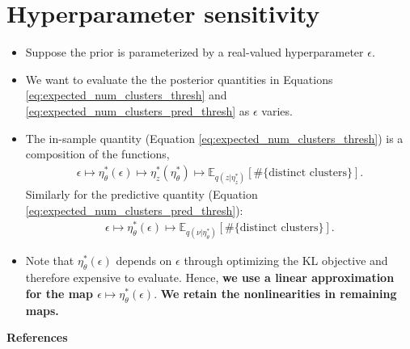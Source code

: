 \documentclass[a0,plainsections]{sciposter}\usepackage[]{graphicx}\usepackage[]{color}
\newcommand{\Expect}{\mathbb{E}}
\newcommand{\etazopt}{\eta_z^{*}}
\newcommand{\etathetaopt}{\eta_\theta^{*}}
\begin{document}
\begin{minipage}[t]{0.45\textwidth}
\vspace{-0.6in}
\section*{Hyperparameter sensitivity}
\vspace{-0.3in}
\begin{itemize}
\item Suppose the prior is parameterized by a real-valued hyperparameter $\epsilon$. 

\item We want to evaluate the the posterior quantities in Equations \ref{eq:expected_num_clusters_thresh} and \ref{eq:expected_num_clusters_pred_thresh} as $\epsilon$ varies. 

\item The in-sample quantity (Equation \ref{eq:expected_num_clusters_thresh}) is a composition of the functions, 
\begin{align*}
\epsilon \mapsto
\etathetaopt(\epsilon) \mapsto
\etazopt\left(\etathetaopt\right) \mapsto
\Expect_{q(z | \etazopt)} \left[ \#\{\text{distinct clusters}\} \right].
\end{align*}
Similarly for the predictive quantity (Equation \ref{eq:expected_num_clusters_pred_thresh}): 
\begin{align*}
\epsilon \mapsto
\etathetaopt(\epsilon) \mapsto
\Expect_{q(\nu | \etathetaopt)} \left[ \#\{\text{distinct clusters}\} \right].
\end{align*}

\item Note that $\etathetaopt(\epsilon)$ depends on $\epsilon$ through optimizing the KL objective and therefore expensive to evaluate. Hence, {\bf we use a linear approximation for the map $\epsilon \mapsto \etathetaopt(\epsilon)$}. {\bf We retain the nonlinearities in remaining maps. }

\end{itemize}

\vspace{0.9in}
{\bf References}
\renewcommand{\section}[2]{}%
\footnotesize{
  
  
}
% 

\end{minipage}
\end{document}

